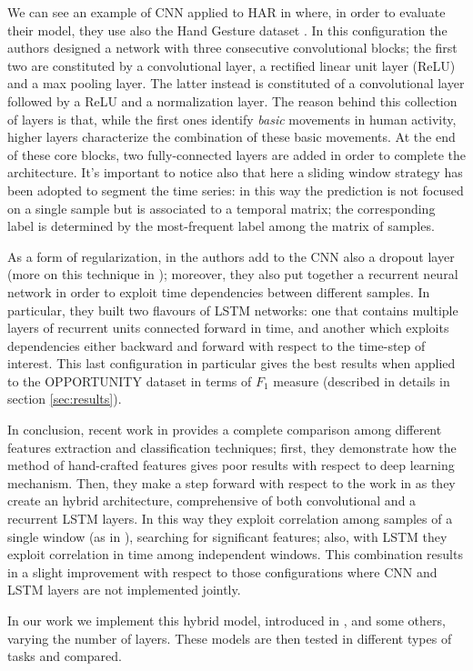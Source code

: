 We can see an example of CNN applied to HAR in \cite{yang2015deep} where, in order to evaluate their model, they use also the Hand Gesture dataset \cite{bulling2014tutorial}. In this configuration the authors designed a network with three consecutive convolutional blocks; the first two are constituted by a convolutional layer, a rectified linear unit layer (ReLU) and a max pooling layer. The latter instead is constituted of a convolutional layer followed by a ReLU and a normalization layer. The reason behind this collection of layers is that, while the first ones identify \textit{basic} movements in human activity, higher layers characterize the combination of these basic movements. At the end of these core blocks, two fully-connected layers are added in order to complete the architecture. It's important to notice also that here a sliding window strategy has been adopted to segment the time series: in this way the prediction is not focused on a single sample but is associated to a temporal matrix; the corresponding label is determined by the most-frequent label among the matrix of samples.

As a form of regularization, in \cite{hammerla2016deep} the authors add to the CNN also a dropout layer (more on this technique in \cite{srivastava2014dropout}); moreover, they also put together a recurrent neural network in order to exploit time dependencies between different samples. In particular, they built two flavours of LSTM networks: one that contains multiple layers of recurrent units connected forward in time, and another which exploits dependencies either backward and forward with respect to the time-step of interest. This last configuration in particular gives the best results when applied to the OPPORTUNITY dataset in terms of $F_1$ measure (described in details in section \ref{sec:results}).

In conclusion, recent work in \cite{li2018comparison} provides a complete comparison among different features extraction and classification techniques; first, they demonstrate how the method of hand-crafted features gives poor results with respect to deep learning mechanism. Then, they make a step forward with respect to the work in \cite{hammerla2016deep} as they create an hybrid architecture, comprehensive of both convolutional and a recurrent LSTM layers. In this way they exploit correlation among samples of a single window (as in \cite{yang2015deep}), searching for significant features; also, with LSTM they exploit correlation in time among independent windows. This combination results in a slight improvement with respect to those configurations where CNN and LSTM layers are not implemented jointly.

In our work we implement this hybrid model, introduced in \cite{li2018comparison}, and some others, varying the number of layers. These models are then tested in different types of tasks and compared.